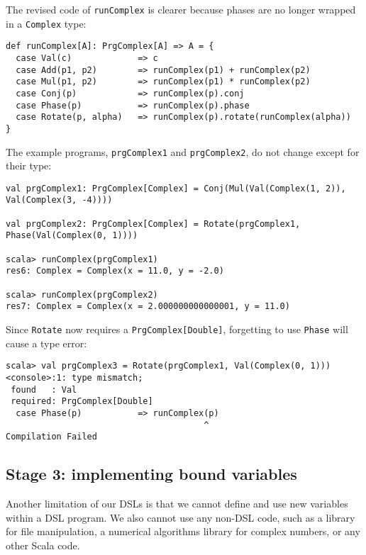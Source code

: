 The revised code of \lstinline!runComplex!
is clearer because phases are no longer wrapped in a \lstinline!Complex!
type:
\begin{lstlisting}
def runComplex[A]: PrgComplex[A] => A = {
  case Val(c)             => c
  case Add(p1, p2)        => runComplex(p1) + runComplex(p2)
  case Mul(p1, p2)        => runComplex(p1) * runComplex(p2)
  case Conj(p)            => runComplex(p).conj
  case Phase(p)           => runComplex(p).phase
  case Rotate(p, alpha)   => runComplex(p).rotate(runComplex(alpha))
}
\end{lstlisting}
The example programs, \lstinline!prgComplex1!
and \lstinline!prgComplex2!,
do not change except for their type:
\begin{lstlisting}
val prgComplex1: PrgComplex[Complex] = Conj(Mul(Val(Complex(1, 2)), Val(Complex(3, -4))))

val prgComplex2: PrgComplex[Complex] = Rotate(prgComplex1, Phase(Val(Complex(0, 1))))

scala> runComplex(prgComplex1)
res6: Complex = Complex(x = 11.0, y = -2.0)

scala> runComplex(prgComplex2)
res7: Complex = Complex(x = 2.000000000000001, y = 11.0)
\end{lstlisting}
Since \lstinline!Rotate!
now requires a \lstinline!PrgComplex[Double]!,
forgetting to use \lstinline!Phase!
will cause a type error:
\begin{lstlisting}
scala> val prgComplex3 = Rotate(prgComplex1, Val(Complex(0, 1)))
<console>:1: type mismatch;
 found   : Val
 required: PrgComplex[Double]                                                              
  case Phase(p)           => runComplex(p)
                                       ^ 
Compilation Failed
\end{lstlisting}

\subsection{Stage 3: implementing bound variables}

Another limitation of our DSLs is that we cannot define and use new
variables within a DSL program. We also cannot use any non-DSL code,
such as a library for file manipulation, a numerical algorithms library
for complex numbers, or any other Scala code. 

